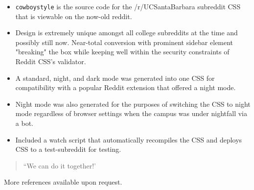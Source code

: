 \documentclass[10pt,letter,ragged2e]{altacv}
\begin{document}
\begin{paracol}{2}
\divider


\begin{itemize}
\item \texttt{cowboystyle} is the source code for the /r/UCSantaBarbara subreddit CSS that is viewable on the now-old reddit.
\item Design is extremely unique amongst all college subreddits at the time and possibly still now. Near-total conversion with prominent sidebar element "breaking" the box while keeping well within the security constraints of Reddit CSS's validator.
\item A standard, night, and dark mode was generated into one CSS for compatibility with a popular Reddit extension that offered a night mode.
\item Night mode was also generated for the purposes of switching the CSS to night mode regardless of browser settings when the campus was under nightfall via a bot.
\item Included a watch script that automatically recompiles the CSS and deploys CSS to a test-subreddit for testing.
\end{itemize}

\newpage

\switchcolumn


\begin{quote}
``We can do it together!'
\end{quote}


   

  

 


\medskip






\divider


\divider

More references available upon request.

\end{paracol}
\end{document}
